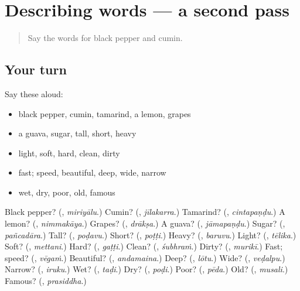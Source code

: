 \section[(dialogue)]{Describing words — a second pass}

\label{lesson:TE-R139-second-pass-describing-words}



\begin{quote}
Say the words for black pepper and cumin.
\end{quote}

\subsection*{Your turn}
Say these aloud:

\begin{itemize}
\raggedright
  \item black pepper, cumin, tamarind, a lemon, grapes
  \item a guava, sugar, tall, short, heavy
  \item light, soft, hard, clean, dirty
  \item fast; speed, beautiful, deep, wide, narrow
  \item wet, dry, poor, old, famous
\end{itemize}

\begin{tcolorbox}[breakable,colback=teal!4,colframe=teal!35!black,title={Before you move on}]
Black pepper? (\textbf{}, \emph{miriyālu}.) Cumin? (\textbf{}, \emph{jīlakarra}.) Tamarind? (\textbf{}, \emph{cintapaṇḍu}.) A lemon? (\textbf{}, \emph{nimmakāya}.) Grapes? (\textbf{}, \emph{drākṣa}.) A guava? (\textbf{}, \emph{jāmapaṇḍu}.) Sugar? (\textbf{}, \emph{pañcadāra}.) Tall? (\textbf{}, \emph{poḍavu}.) Short? (\textbf{}, \emph{poṭṭi}.) Heavy? (\textbf{}, \emph{baruvu}.) Light? (\textbf{}, \emph{tēlika}.) Soft? (\textbf{}, \emph{mettani}.) Hard? (\textbf{}, \emph{gaṭṭi}.) Clean? (\textbf{}, \emph{śubhraṁ}.) Dirty? (\textbf{}, \emph{murikī}.) Fast; speed? (\textbf{}, \emph{vēgaṁ}.) Beautiful? (\textbf{}, \emph{andamaina}.) Deep? (\textbf{}, \emph{lōtu}.) Wide? (\textbf{}, \emph{veḍalpu}.) Narrow? (\textbf{}, \emph{iruku}.) Wet? (\textbf{}, \emph{taḍi}.) Dry? (\textbf{}, \emph{poḍi}.) Poor? (\textbf{}, \emph{pēda}.) Old? (\textbf{}, \emph{musali}.) Famous? (\textbf{}, \emph{prasiddha}.)
\end{tcolorbox}
